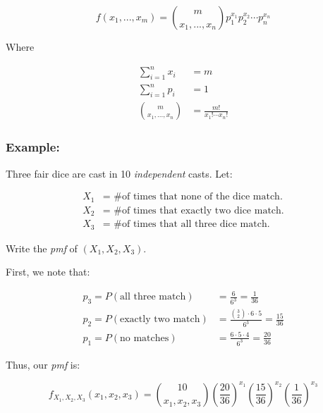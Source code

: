 \documentclass{article}
\begin{document}
\begin{equation*}
    f(x_1,...,x_m) = {m \choose x_1,...,x_n} p_1^{x_1}p_2^{x_2}\cdots p_n^{x_n}
\end{equation*}

\noindent Where 

\begin{equation*}
    \begin{split}
        \sum_{i=1}^n x_i &= m\\
        \sum_{i=1}^n p_i &= 1\\
        {m \choose x_1,...,x_n} &= \frac{m!}{x_1!\cdots x_n!}
    \end{split}
\end{equation*}

\subsubsection*{Example:}

Three fair dice are cast in 10 \textit{independent} casts. Let:

\begin{equation*}
    \begin{split}
        X_1 &= \text{ \# of times that none of the dice match.}\\
        X_2 &= \text{ \# of times that exactly two dice match.}\\
        X_3 &= \text{ \# of times that all three dice match.}
    \end{split}
\end{equation*}

Write the \textit{pmf} of $(X_1,X_2,X_3)$.

First, we note that:

\begin{equation*}
    \begin{split}
        p_3 = P(\text{all three match}) &= \frac{6}{6^3} = \frac{1}{36}\\
        p_2 = P(\text{exactly two match}) &= \frac{{3\choose 2} \cdot 6 \cdot 5}{6^3} = \frac{15}{36}\\
        p_1 = P(\text{no matches}) &= \frac{6\cdot 5 \cdot 4}{6^3} = \frac{20}{36}
    \end{split}
\end{equation*}

\noindent Thus, our \textit{pmf} is:

\begin{equation*}
    f_{X_1,X_2,X_3} (x_1,x_2,x_3) = {10 \choose x_1, x_2, x_3} \left(\frac{20}{36} \right)^{x_1} \left(\frac{15}{36} \right)^{x_2} \left(\frac{1}{36} \right)^{x_3}
\end{equation*}
\end{document}
